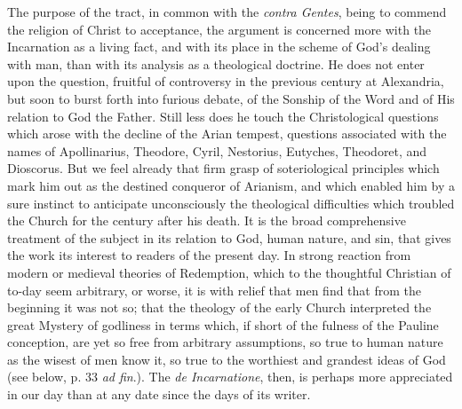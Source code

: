 The purpose of the tract, in common with the \emph{contra Gentes}, being to commend the religion of Christ to acceptance, the argument is concerned more with the Incarnation as a living fact, and with its place in the scheme of God’s dealing with man, than with its analysis as a theological doctrine. He does not enter upon the question, fruitful of controversy in the previous century at Alexandria, but soon to burst forth into furious debate, of the Sonship of the Word and of His relation to God the Father. Still less does he touch the Christological questions which arose with the decline of the Arian tempest, questions associated with the names of Apollinarius, Theodore, Cyril, Nestorius, Eutyches, Theodoret, and Dioscorus. But we feel already that firm grasp of soteriological principles which mark him out as the destined conqueror of Arianism, and which enabled him by a sure instinct to anticipate unconsciously the theological difficulties which troubled the Church for the century after his death. It is the broad comprehensive treatment of the subject in its relation to God, human nature, and sin, that gives the work its interest to readers of the present day. In strong reaction from modern or medieval theories of Redemption, which to the thoughtful Christian of to-day seem arbitrary, or worse, it is with relief that men find that from the beginning it was not so; that the theology of the early Church interpreted the great Mystery of godliness in terms which, if short of the fulness of the Pauline conception, are yet so free from arbitrary assumptions, so true to human nature as the wisest of men know it, so true to the worthiest and grandest ideas of God (see below, p. 33 \emph{ad fin}.). The \emph{de Incarnatione}, then, is perhaps more appreciated in our day than at any date since the days of its writer.

